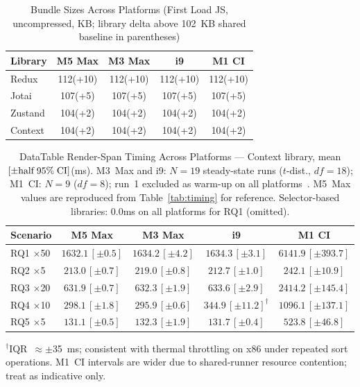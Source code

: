 \documentclass[conference]{IEEEtran}
\begin{document}
\begin{table}[!ht]
\caption{Bundle Sizes Across Platforms (First Load JS, uncompressed, KB;
  library delta above 102~KB shared baseline in parentheses)}
\label{tab:bundle-hw}
\begin{center}
\scriptsize
\setlength{\tabcolsep}{3pt}
\begin{tabular}{lcccc}
\toprule
\textbf{Library} & \textbf{M5 Max} & \textbf{M3 Max} & \textbf{i9} & \textbf{M1 CI} \\
\midrule
Redux   & 112\;(+10) & 112\;(+10) & 112\;(+10) & 112\;(+10) \\
Jotai   & 107\;(\phantom{0}+5)  & 107\;(\phantom{0}+5)  & 107\;(\phantom{0}+5)  & 107\;(\phantom{0}+5)  \\
Zustand & 104\;(\phantom{0}+2)  & 104\;(\phantom{0}+2)  & 104\;(\phantom{0}+2)  & 104\;(\phantom{0}+2)  \\
Context & 104\;(\phantom{0}+2)  & 104\;(\phantom{0}+2)  & 104\;(\phantom{0}+2)  & 104\;(\phantom{0}+2)  \\
\bottomrule
\end{tabular}
\end{center}
\end{table}

\begin{table}[H]
\caption{DataTable Render-Span Timing Across Platforms --- Context
  library, mean\;$[\pm\text{half\;95\%\;CI}]$\;(ms).
  M3~Max and i9: $N{=}19$ steady-state runs ($t$-dist., $df{=}18$);
  M1~CI: $N{=}9$ ($df{=}8$); run~1 excluded as warm-up on all
  platforms~\cite{b10}.
  M5~Max values are reproduced from Table~\ref{tab:timing} for
  reference.  Selector-based libraries:
  0.0\;[±0.0]\;ms on all platforms for RQ1 (omitted).}
\label{tab:timing-hw}
\begin{center}
\scriptsize
\setlength{\tabcolsep}{3pt}
\begin{tabular}{lcccc}
\toprule
\textbf{Scenario}
  & \textbf{M5 Max}
  & \textbf{M3 Max}
  & \textbf{i9}
  & \textbf{M1 CI} \\
\midrule
RQ1 $\times$50
  & $1632.1\,[\pm 0.5]$
  & $1634.2\,[\pm 4.2]$
  & $1634.3\,[\pm 3.1]$
  & $6141.9\,[\pm 393.7]$ \\
RQ2 $\times$5
  & $213.0\,[\pm 0.7]$
  & $219.0\,[\pm 0.8]$
  & $212.7\,[\pm 1.0]$
  & $242.1\,[\pm 10.9]$ \\
RQ3 $\times$20
  & $631.9\,[\pm 0.7]$
  & $632.3\,[\pm 1.9]$
  & $633.6\,[\pm 2.9]$
  & $2414.2\,[\pm 145.4]$ \\
RQ4 $\times$10
  & $298.1\,[\pm 1.8]$
  & $295.9\,[\pm 0.6]$
  & $344.9\,[\pm 11.2]^\dagger$
  & $1096.1\,[\pm 137.1]$ \\
RQ5 $\times$5
  & $131.1\,[\pm 0.5]$
  & $132.3\,[\pm 1.9]$
  & $131.7\,[\pm 0.4]$
  & $523.8\,[\pm 46.8]$ \\
\bottomrule
\end{tabular}
\end{center}
$^\dagger$IQR~$\approx\pm$35~ms; consistent with thermal throttling on
x86 under repeated sort operations. M1~CI intervals are wider due to
shared-runner resource contention; treat as indicative only.
\end{table}
\end{document}
